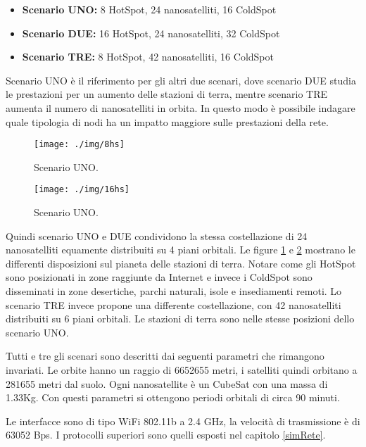 \documentclass[12pt,a4paper,oneside]{book}
\begin{document}
		\begin{itemize}
			\item {\bf Scenario UNO:} 8 HotSpot, 24 nanosatelliti, 16 ColdSpot
			\item {\bf Scenario DUE:} 16 HotSpot, 24 nanosatelliti, 32 ColdSpot
			\item {\bf Scenario TRE:} 8 HotSpot, 42 nanosatelliti, 16 ColdSpot
		\end{itemize}
		
		Scenario UNO è il riferimento per gli altri due scenari, dove scenario DUE studia le prestazioni per un aumento delle stazioni di terra, mentre scenario TRE aumenta il numero di nanosatelliti in orbita. In questo modo è possibile indagare quale tipologia di nodi ha un impatto maggiore sulle prestazioni della rete.
		
		\begin{figure}[!b]
			\centering
			\texttt{[image: ./img/8hs]}
			\caption{Scenario UNO.}
			\label{fig:8hs}
		\end{figure}	
		
		\begin{figure}[!h]
			\centering
			\texttt{[image: ./img/16hs]}
			\caption{Scenario UNO.}
			\label{fig:16hs}
		\end{figure}			
		
		Quindi scenario UNO e DUE condividono la stessa costellazione di 24 nanosatelliti equamente distribuiti su 4 piani orbitali. Le figure \ref{fig:8hs} e \ref{fig:16hs} mostrano le differenti disposizioni sul pianeta delle stazioni di terra. Notare come gli HotSpot sono posizionati in zone raggiunte da Internet e invece i ColdSpot sono disseminati in zone desertiche, parchi naturali, isole e insediamenti remoti. 
		Lo scenario TRE invece propone una differente costellazione, con 42 nanosatelliti distribuiti su 6 piani orbitali. Le stazioni di terra sono nelle stesse posizioni dello scenario UNO.
		
		Tutti e tre gli scenari sono descritti dai seguenti parametri che rimangono invariati. Le orbite hanno un raggio di 6652655 metri, i satelliti quindi orbitano a 281655 metri dal suolo. Ogni nanosatellite è un CubeSat con una massa di 1.33Kg. Con questi parametri si ottengono periodi orbitali di circa 90 minuti.
		
		Le interfacce sono di tipo WiFi 802.11b a 2.4 GHz, la velocità di trasmissione è di 63052 Bps. I protocolli superiori sono quelli esposti nel capitolo \ref{simRete}.
														
\end{document}
